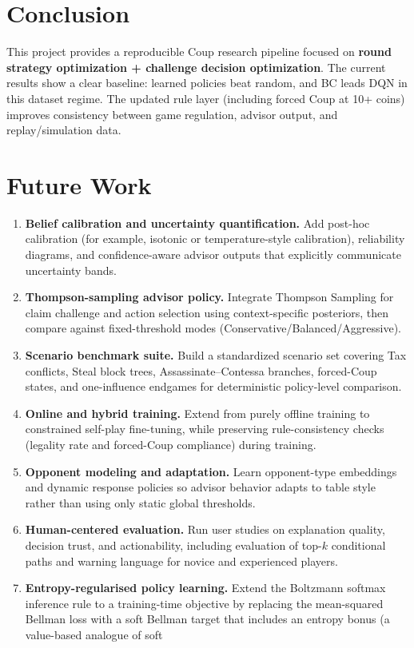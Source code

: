 \documentclass[11pt]{article}
\begin{document}
\section{Conclusion}
This project provides a reproducible Coup research pipeline focused on \textbf{round strategy optimization + challenge decision optimization}. The current results show a clear baseline: learned policies beat random, and BC leads DQN in this dataset regime. The updated rule layer (including forced Coup at 10+ coins) improves consistency between game regulation, advisor output, and replay/simulation data.

\section{Future Work}
\begin{enumerate}
  \item \textbf{Belief calibration and uncertainty quantification.} Add post-hoc calibration (for example, isotonic or temperature-style calibration), reliability diagrams, and confidence-aware advisor outputs that explicitly communicate uncertainty bands.
  \item \textbf{Thompson-sampling advisor policy.} Integrate Thompson Sampling for claim challenge and action selection using context-specific posteriors, then compare against fixed-threshold modes (Conservative/Balanced/Aggressive).
  \item \textbf{Scenario benchmark suite.} Build a standardized scenario set covering Tax conflicts, Steal block trees, Assassinate--Contessa branches, forced-Coup states, and one-influence endgames for deterministic policy-level comparison.
  \item \textbf{Online and hybrid training.} Extend from purely offline training to constrained self-play fine-tuning, while preserving rule-consistency checks (legality rate and forced-Coup compliance) during training.
  \item \textbf{Opponent modeling and adaptation.} Learn opponent-type embeddings and dynamic response policies so advisor behavior adapts to table style rather than using only static global thresholds.
  \item \textbf{Human-centered evaluation.} Run user studies on explanation quality, decision trust, and actionability, including evaluation of top-$k$ conditional paths and warning language for novice and experienced players.
  \item \textbf{Entropy-regularised policy learning.} Extend the Boltzmann softmax inference rule to a training-time objective by replacing the mean-squared Bellman loss with a soft Bellman target that includes an entropy bonus (a value-based analogue of soft

\end{enumerate}
\end{document}
